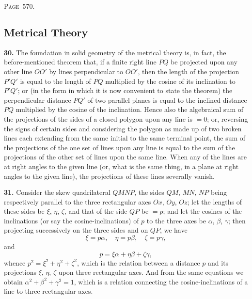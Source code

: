 \documentclass[11pt,a4paper]{article}
\theoremstyle{definition}
\begin{document}
\newpage
\noindent\textsc{Page~570.} \subsection*{Metrical Theory}

\textbf{30.} The foundation in solid geometry of the metrical theory is, in fact, the before-mentioned theorem that, if a finite right line $PQ$ be projected upon any other line $OO'$ by lines perpendicular to $OO'$, then the length of the projection $P'Q'$ is equal to the length of $PQ$ multiplied by the cosine of its inclination to $P'Q'$; or (in the form in which it is now convenient to state the theorem) the perpendicular distance $PQ'$ of two parallel planes is equal to the inclined distance $PQ$ multiplied by the cosine of the inclination. Hence also the algebraical sum of the projections of the sides of a closed polygon upon any line is $=0$; or, reversing the signs of certain sides and considering the polygon as made up of two broken lines each extending from the same initial to the same terminal point, the sum of the projections of the one set of lines upon any line is equal to the sum of the projections of the other set of lines upon the same line. When any of the lines are at right angles to the given line (or, what is the same thing, in a plane at right angles to the given line), the projections of these lines severally vanish.

\textbf{31.} Consider the skew quadrilateral $QMNP$, the sides $QM$, $MN$, $NP$ being respectively parallel to the three rectangular axes $Ox$, $Oy$, $Oz$; let the lengths of these sides be $\xi$, $\eta$, $\zeta$, and that of the side $QP$ be $=p$; and let the cosines of the inclinations (or say the cosine-inclinations) of $p$ to the three axes be $\alpha$, $\beta$, $\gamma$; then projecting successively on the three sides and on $QP$, we have
\[
\xi=p\alpha,\quad \eta=p\beta,\quad \zeta=p\gamma,
\]
and
\[
p=\xi\alpha+\eta\beta+\zeta\gamma,
\]
whence $p^2=\xi^2+\eta^2+\zeta^2$, which is the relation between a distance $p$ and its projections $\xi$, $\eta$, $\zeta$ upon three rectangular axes. And from the same equations we obtain $\alpha^2+\beta^2+\gamma^2=1$, which is a relation connecting the cosine-inclinations of a line to three rectangular axes.
\end{document}
